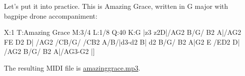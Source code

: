 \documentclass[a4paper,fullpage,12pt]{book}
\begin{document}
Let's put it into practice. This is Amazing Grace, written in G major with
bagpipe drone accompaniment:

\begin{abcsource}
X:1
T:Amazing Grace
M:3/4
L:1/8
Q:40
K:G
|z3 z2D|{/A}G2 B/G/ B2 A|{/A}G2 {F}E D2 D|
{/A}G2 {/C}B/G/ {/C}B2 A/B/|d3-d2 B|
d2 B/G/ B2 A|G2 E {/E}D2 D|
{/A}G2 B/G/ B2 A|{/A}G3-G2 |]
\end{abcsource}

The resulting MIDI file is \href{run:amazinggrace.mp3}{amazinggrace.mp3}.










\end{document}
